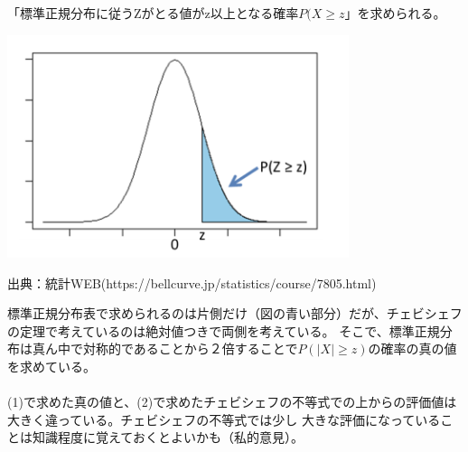 \documentclass[a4j,uplatex,dvipdfmx]{jsarticle}
\begin{document}
\begin{tcolorbox}[
    title = 標準正規分布表,
  ]
  「標準正規分布に従うZがとる値がz以上となる確率$P(X\ge z$」を求められる。\\
  \begin{center}
    \includegraphics[width=10cm]{ans07_02.png}\\
  \end{center}
  出典：統計WEB(https://bellcurve.jp/statistics/course/7805.html) 
    \end{tcolorbox}

標準正規分布表で求められるのは片側だけ（図の青い部分）だが、チェビシェフの定理で考えているのは絶対値つきで両側を考えている。
そこで、標準正規分布は真ん中で対称的であることから２倍することで$P(|X|\ge z)$の確率の真の値を求めている。
\\ \\ 
(1)で求めた真の値と、(2)で求めたチェビシェフの不等式での上からの評価値は大きく違っている。チェビシェフの不等式では少し
大きな評価になっていることは知識程度に覚えておくとよいかも（私的意見）。
\\
\end{document}

